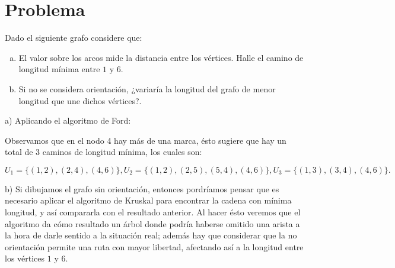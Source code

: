 \documentclass[autocontact]{gaceta}
\begin{document}
\section{Problema}
    Dado el siguiente grafo considere que:
    \begin{center}
        \begin{enumerate}[a)]
            \item El valor sobre los arcos mide la distancia  entre los vértices. Halle el camino 
                de longitud mínima entre $1$ y $6$.
            \item Si no se considera orientación, ¿variaría la longitud del grafo de menor longitud
                que une dichos vértices?.
        \end{enumerate}        
    \end{center}

    
    \pagebreak
    a) Aplicando el algoritmo de Ford:

    
    Observamos que en el nodo 4 hay más de una marca, ésto sugiere que hay un total de 3 caminos de
    longitud mínima, los cuales son:
    \begin{center}
        \begin{equation}
            U_1 = \{(1,2), (2,4), (4,6)\}, U_2 = \{(1,2), (2,5), (5,4), (4,6)\}, U_3 = \{(1,3), (3,4), (4,6)\}.            
        \end{equation}
    \end{center}

    b) Si dibujamos el grafo sin orientación, entonces pordríamos pensar que es necesario aplicar el 
    algoritmo de Kruskal para encontrar la cadena con mínima longitud, y así compararla con el 
    resultado anterior. Al hacer ésto veremos que el algoritmo da cómo resultado un árbol 
    donde podría haberse omitido una arista a la hora de darle sentido 
    a la situación real; además hay que considerar que la no orientación permite una ruta con 
    mayor libertad, afectando así a la longitud entre los vértices $1$ y $6$.
    
 

\end{document}
